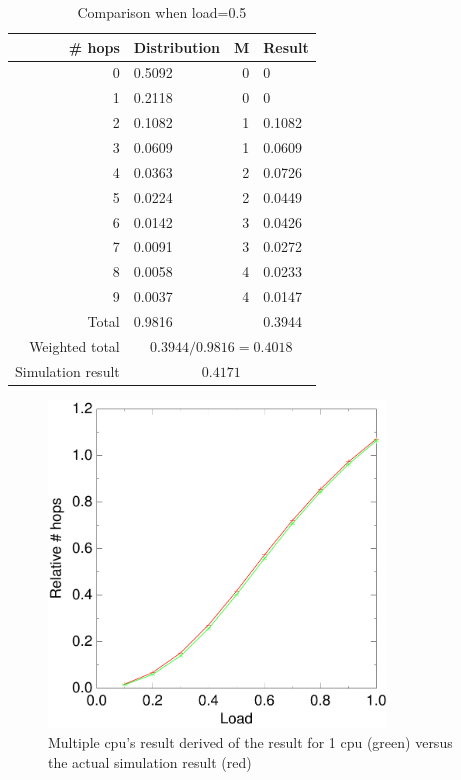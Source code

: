 \documentclass[10pt,a4paper]{article}
\begin{document}
\begin{table}
\centering
\begin{tabular}{|r|l|r|l|} \hline
\# hops & Distribution & M & Result \\ \hline
0 & 0.5092 & 0 & 0 \\ \hline
1 & 0.2118 & 0 & 0 \\ \hline
2 & 0.1082 & 1 & 0.1082 \\ \hline
3 & 0.0609 & 1 & 0.0609 \\ \hline
4 & 0.0363 & 2 & 0.0726 \\ \hline
5 & 0.0224 & 2 & 0.0449 \\ \hline
6 & 0.0142 & 3 & 0.0426 \\ \hline
7 & 0.0091 & 3 & 0.0272 \\ \hline
8 & 0.0058 & 4 & 0.0233 \\ \hline
9 & 0.0037 & 4 & 0.0147 \\ \hline
Total &  0.9816 & &  0.3944 \\ \hline
Weighted total & \multicolumn{3}{|c|}{$0.3944/0.9816 = 0.4018 $} \\ \hline
Simulation result & \multicolumn{3}{|c|}{$0.4171$} \\ \hline
\end{tabular}
\caption{Comparison when load=0.5}
\label{tabcpus}
\end{table}

\begin{figure}[h!tb]
\centering
\includegraphics[width=0.8\textwidth]{data/right_5_2.pdf}
\caption{Multiple cpu's result derived of the result for 1 cpu (green) versus the actual simulation result (red)}
\label{figcpusmatch}
\end{figure}
\end{document}
